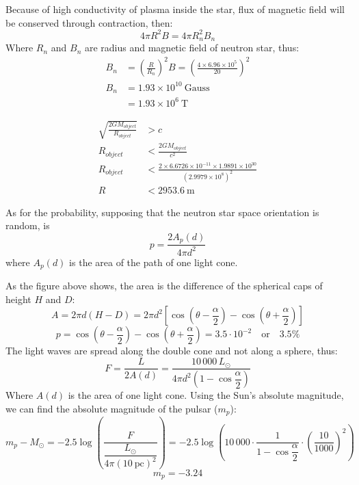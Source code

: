 Because of high conductivity of plasma inside the star, flux of magnetic field
will be conserved through contraction, then:
\[
4\pi R^2 B = 4\pi R_n^2 B_n \tag*{(6 points)}
\]
Where $R_n$ and $B_n$ are radius and magnetic field of neutron star, thus:
\begin{align*}
B_n &= \left(\frac{R}{R_n}\right)^2 B
     = \left(\frac{4 \times 6.96 \times 10^{5}}{20}\right)^2 \tag*{(2 points)}\\
B_n &= 1.93 \times 10^{10}~\mathrm{Gauss}\\
    &= 1.93 \times 10^{6}~\mathrm{T} \tag*{(2 points)}
\end{align*}

\begin{align*}
\sqrt{\frac{2GM_{object}}{R_{object}}} &> c \tag*{(4 points)}\\
R_{object} &< \frac{2GM_{object}}{c^2} \tag*{(2 points)}\\
R_{object} &< \frac{2 \times 6.6726 \times 10^{-11} \times 1.9891 \times 10^{30}}
                  {(2.9979 \times 10^{8})^2}\\
R &< 2953.6~\mathrm{m} \tag*{(4 points)}
\end{align*}

As for the probability, supposing that the neutron star space orientation is
random, is
\[
p = \frac{2A_p(d)}{4\pi d^2} \tag*{(2 pt)}
\]
where $A_p(d)$ is the area of the path of one light cone.


As the figure above shows, the area is the difference of the spherical caps of
height $H$ and $D$:
\[
A = 2\pi d (H - D)
  = 2\pi d^2 \left[\cos\left(\theta - \frac{\alpha}{2}\right)
    - \cos\left(\theta + \frac{\alpha}{2}\right)\right] \tag*{(3 pt)}
\]
\[
p = \cos\left(\theta - \frac{\alpha}{2}\right)
  - \cos\left(\theta + \frac{\alpha}{2}\right)
  = 3.5 \cdot 10^{-2} \quad \text{or} \quad 3.5\% \tag*{(2 pt)}
\]
The light waves are spread along the double cone and not along a sphere, thus:
\[
F = \frac{L}{2A(d)}
  = \frac{10\,000\,L_\odot}{4\pi d^2\left(1 - \cos\dfrac{\alpha}{2}\right)}
\]
Where $A(d)$ is the area of one light cone. Using the Sun's absolute magnitude,
we can find the absolute magnitude of the pulsar ($m_p$):
\[
m_p - M_\odot
  = -2.5\log\left(\frac{F}{\dfrac{L_\odot}{4\pi(10~\mathrm{pc})^2}}\right)
  = -2.5\log\left(10\,000 \cdot \frac{1}{1 - \cos\dfrac{\alpha}{2}}
    \cdot \left(\frac{10}{1000}\right)^2\right) \tag*{(3 pt)}
\]
\[
m_p = -3.24
\]

